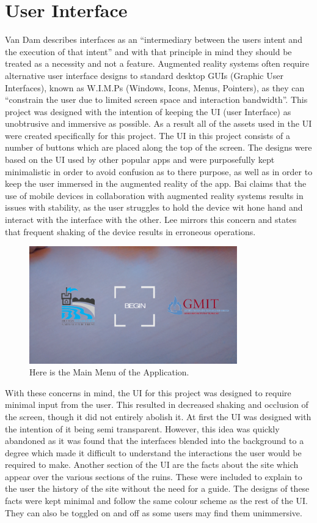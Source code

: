 \section{User Interface}
Van Dam describes interfaces as an “intermediary between the users intent and the execution of that intent”  and with that principle in mind they should be treated as a necessity and not a feature\cite{avd}. Augmented reality systems often require alternative user interface designs to standard desktop GUIs (Graphic User Interfaces), known as W.I.M.Ps (Windows, Icons, Menus, Pointers), as they can “constrain the user due to limited screen space and interaction bandwidth”\cite{spacetop}. This project was designed with the intention of keeping the UI (user Interface) as unobtrusive and immersive as possible. As a result all of the assets used in the UI were created specifically for this project. The UI in this project consists of a number of buttons which are placed along the top of the screen. The designs were based on the UI used by other popular apps and were purposefully kept minimalistic in order to avoid confusion as to there purpose, as well as in order to keep the user immersed in the augmented reality of the app.
Bai claims that the use of mobile devices in collaboration with augmented reality systems results in issues with stability, as the user struggles to hold the device wit hone hand and interact with the interface with the other\cite{interactiveMethods}. Lee mirrors this concern and states that frequent shaking of the device results in erroneous operations\cite{freezesetgo}.

\begin{figure}[ht!]
	\centering
	\includegraphics[width=90mm]{mainMenu}
	\caption{Here is the Main Menu of the Application. \label{overflow}}
\end{figure}

With these concerns in mind, the UI for this project was designed to require minimal input from the user. This resulted in decreased shaking and occlusion of the screen, though it did not entirely abolish it.
At first the UI was designed with the intention of it being semi transparent. However, this idea was quickly abandoned as it was found that the interfaces blended into the background to a degree which made it difficult to understand the interactions the user would be required to make.
Another section of the UI are the facts about the site which appear over the various sections of the ruins. These were included to explain to the user the history of the site without the need for a guide. The designs of these facts were kept minimal and follow the same colour scheme as the rest of the UI. They can also be toggled on and off as some users may find them unimmersive.

